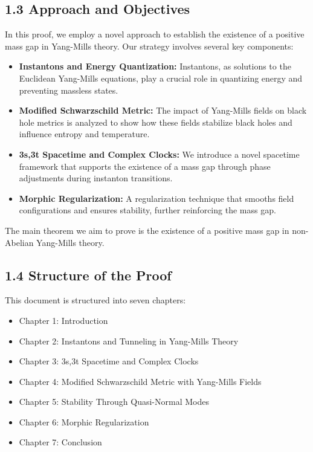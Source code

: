 \documentclass{article}
\begin{document}
\subsection*{1.3 Approach and Objectives}
In this proof, we employ a novel approach to establish the existence of a positive mass gap in Yang-Mills theory. Our strategy involves several key components:
\begin{itemize}
    \item \textbf{Instantons and Energy Quantization:} Instantons, as solutions to the Euclidean Yang-Mills equations, play a crucial role in quantizing energy and preventing massless states.
    \item \textbf{Modified Schwarzschild Metric:} The impact of Yang-Mills fields on black hole metrics is analyzed to show how these fields stabilize black holes and influence entropy and temperature.
    \item \textbf{3s,3t Spacetime and Complex Clocks:} We introduce a novel spacetime framework that supports the existence of a mass gap through phase adjustments during instanton transitions.
    \item \textbf{Morphic Regularization:} A regularization technique that smooths field configurations and ensures stability, further reinforcing the mass gap.
\end{itemize}
The main theorem we aim to prove is the existence of a positive mass gap in non-Abelian Yang-Mills theory.

\subsection*{1.4 Structure of the Proof}
This document is structured into seven chapters:
\begin{itemize}
    \item Chapter 1: Introduction
    \item Chapter 2: Instantons and Tunneling in Yang-Mills Theory
    \item Chapter 3: 3s,3t Spacetime and Complex Clocks
    \item Chapter 4: Modified Schwarzschild Metric with Yang-Mills Fields
    \item Chapter 5: Stability Through Quasi-Normal Modes
    \item Chapter 6: Morphic Regularization
    \item Chapter 7: Conclusion
\end{itemize}
\end{document}
